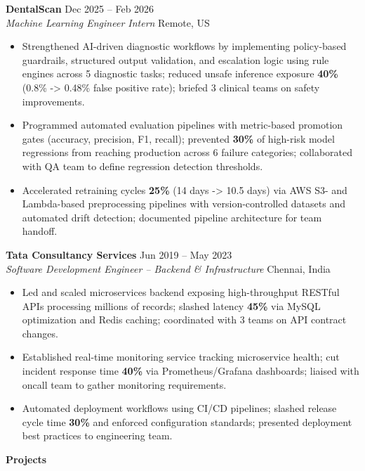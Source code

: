 \documentclass[10pt, letterpaper]{article}
\newcommand{\mysection}[1]{%
  \vspace{10pt}%
  {\noindent\large\bfseries #1}%
  \vspace{4pt}{\hrule}%
  \vspace{6pt}%
}
\newcommand{\resumeItem}[1]{\item\small{#1}}
\begin{document}
\noindent\textbf{DentalScan} \hfill Dec 2025 -- Feb 2026 \\
\textit{Machine Learning Engineer Intern} \hfill Remote, US
\begin{itemize}
  \resumeItem{Strengthened AI-driven diagnostic workflows by implementing policy-based guardrails, structured output validation, and escalation logic using rule engines across 5 diagnostic tasks; reduced unsafe inference exposure \textbf{40\%} (0.8\% -> 0.48\% false positive rate); briefed 3 clinical teams on safety improvements.}
  \resumeItem{Programmed automated evaluation pipelines with metric-based promotion gates (accuracy, precision, F1, recall); prevented \textbf{30\%} of high-risk model regressions from reaching production across 6 failure categories; collaborated with QA team to define regression detection thresholds.}
  \resumeItem{Accelerated retraining cycles \textbf{25\%} (14 days -> 10.5 days) via AWS S3- and Lambda-based preprocessing pipelines with version-controlled datasets and automated drift detection; documented pipeline architecture for team handoff.}
\end{itemize}

\noindent\textbf{Tata Consultancy Services} \hfill Jun 2019 -- May 2023 \\
\textit{Software Development Engineer -- Backend \& Infrastructure} \hfill Chennai, India
\begin{itemize}
  \resumeItem{Led and scaled microservices backend exposing high-throughput RESTful APIs processing millions of records; slashed latency \textbf{45\%} via MySQL optimization and Redis caching; coordinated with 3 teams on API contract changes.}
  \resumeItem{Established real-time monitoring service tracking microservice health; cut incident response time \textbf{40\%} via Prometheus/Grafana dashboards; liaised with oncall team to gather monitoring requirements.}
  \resumeItem{Automated deployment workflows using CI/CD pipelines; slashed release cycle time \textbf{30\%} and enforced configuration standards; presented deployment best practices to engineering team.}
\end{itemize}

\vspace{-3mm}
\mysection{Projects}
\end{document}
